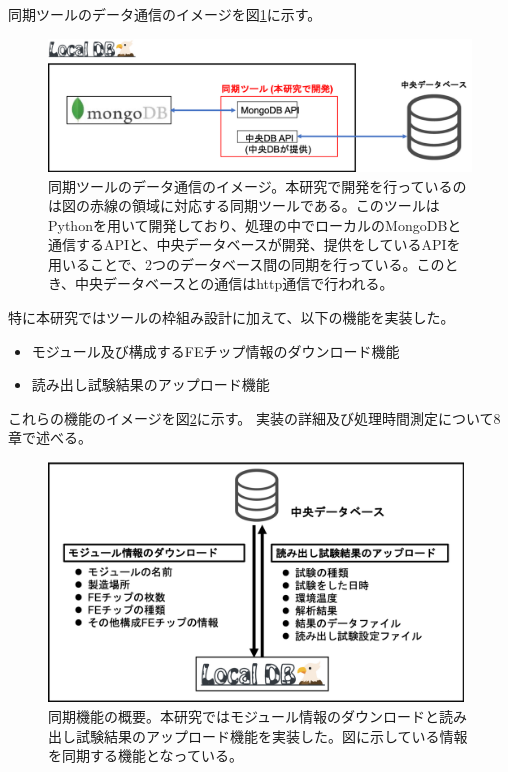 同期ツールのデータ通信のイメージを図\ref{interfacing_tools_system}に示す。
\begin{figure}[bpt]\centering
\includegraphics[width=13cm]{./interfacing_tools_system.png}
\caption[同期ツールのデータ通信のイメージ]{同期ツールのデータ通信のイメージ。本研究で開発を行っているのは図の赤線の領域に対応する同期ツールである。このツールはPythonを用いて開発しており、処理の中でローカルのMongoDBと通信するAPIと、中央データベースが開発、提供をしているAPIを用いることで、2つのデータベース間の同期を行っている。このとき、中央データベースとの通信はhttp通信で行われる。}
\label{interfacing_tools_system}
\end{figure}

特に本研究ではツールの枠組み設計に加えて、以下の機能を実装した。
\begin{itemize}
  \item モジュール及び構成するFEチップ情報のダウンロード機能
  \item 読み出し試験結果のアップロード機能
\end{itemize}

これらの機能のイメージを図\ref{interface_overview}に示す。
実装の詳細及び処理時間測定について8章で述べる。

\begin{figure}[bpt]\centering
\includegraphics[width=11cm]{./interface_overview.png}
\caption[同期機能の概要]{同期機能の概要。本研究ではモジュール情報のダウンロードと読み出し試験結果のアップロード機能を実装した。図に示している情報を同期する機能となっている。}
\label{interface_overview}
\end{figure}

